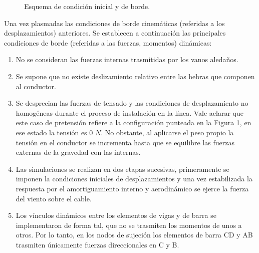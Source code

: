 \begin{figure}[htbp]
	\centering
	\def\svgwidth{80mm}
	
	\caption{Esquema de condición inicial y de borde.}
	\label{fig:MET:EsquemaCondiciones}
\end{figure}

Una vez plasmadas las condiciones de borde cinemáticas (referidas a los desplazamientos) anteriores. Se establecen a continuación las principales condiciones de borde (referidas a las fuerzas, momentos) dinámicas:

\begin{enumerate}
	\item  No se consideran las fuerzas internas trasmitidas por los vanos aledaños.
	\item Se supone que  no existe deslizamiento relativo entre las hebras que componen al conductor.
	\item  Se desprecian las fuerzas de tensado y las condiciones de desplazamiento no homogéneas durante el proceso de instalación en la línea. Vale aclarar que este caso de pretensión refiere a la configuración punteada en la Figura \ref{fig:MET:EsquemaCondiciones}, en ese estado la tensión es 0 $N$. No obstante, al aplicarse el peso propio la tensión en el conductor se incrementa hasta que se equilibre las fuerzas externas de la gravedad con las internas. 
	\item Las simulaciones se realizan en dos etapas sucesivas, primeramente se imponen la condiciones iniciales de desplazamientos y una vez estabilizada la respuesta por el amortiguamiento interno y aerodinámico se ejerce la fuerza del viento sobre el cable. 
	\item Los vínculos dinámicos entre los elementos de vigas y de barra se implementaron de forma tal, que no se trasmiten los momentos de unos a otros. Por lo tanto, en los nodos de sujeción los elementos de barra CD y AB trasmiten únicamente fuerzas direccionales en C y B. 
\end{enumerate} 




